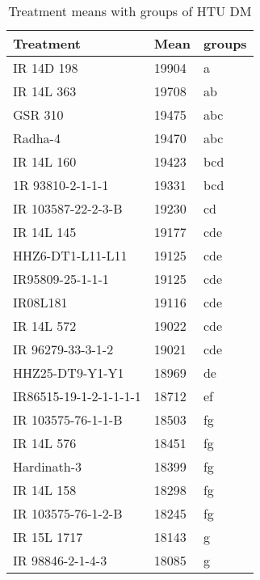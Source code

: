 \documentclass[]{article}
\begin{document}
\begin{longtable}{lll}
\caption{\label{tab:two-fac-groups-tab-agroclimate-early}Treatment means with groups of HTU DM}\\
\toprule
Treatment & Mean & groups\\
\midrule
\rowcolor{gray!6}  IR 14D 198 & 19904 & a\\
IR 14L 363 & 19708 & ab\\
\rowcolor{gray!6}  GSR 310 & 19475 & abc\\
Radha-4 & 19470 & abc\\
\rowcolor{gray!6}  IR 14L 160 & 19423 & bcd\\
\addlinespace
1R 93810-2-1-1-1 & 19331 & bcd\\
\rowcolor{gray!6}  IR 103587-22-2-3-B & 19230 & cd\\
IR 14L 145 & 19177 & cde\\
\rowcolor{gray!6}  HHZ6-DT1-L11-L11 & 19125 & cde\\
IR95809-25-1-1-1 & 19125 & cde\\
\addlinespace
\rowcolor{gray!6}  IR08L181 & 19116 & cde\\
IR 14L 572 & 19022 & cde\\
\rowcolor{gray!6}  IR 96279-33-3-1-2 & 19021 & cde\\
HHZ25-DT9-Y1-Y1 & 18969 & de\\
\rowcolor{gray!6}  IR86515-19-1-2-1-1-1-1 & 18712 & ef\\
\addlinespace
IR 103575-76-1-1-B & 18503 & fg\\
\rowcolor{gray!6}  IR 14L 576 & 18451 & fg\\
Hardinath-3 & 18399 & fg\\
\rowcolor{gray!6}  IR 14L 158 & 18298 & fg\\
IR 103575-76-1-2-B & 18245 & fg\\
\addlinespace
\rowcolor{gray!6}  IR 15L 1717 & 18143 & g\\
IR 98846-2-1-4-3 & 18085 & g\\
\bottomrule
\end{longtable}
\endgroup{}
\begingroup\fontsize{12}{14}\selectfont
\end{document}
